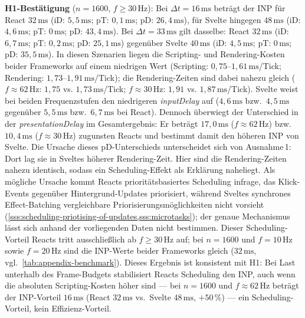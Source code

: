 \noindent\textbf{H1-Bestätigung} ($n = 1600$, $f \geq 30\,\text{Hz}$): Bei $\Delta t = 16\,\text{ms}$ beträgt der INP für React $32\,\text{ms}$ (iD: $5{,}5\,\text{ms}$; pT: $0{,}1\,\text{ms}$; pD: $26{,}4\,\text{ms}$), für Svelte hingegen $48\,\text{ms}$ (iD: $4{,}6\,\text{ms}$; pT: $0\,\text{ms}$; pD: $43{,}4\,\text{ms}$). Bei $\Delta t = 33\,\text{ms}$ gilt dasselbe: React $32\,\text{ms}$ (iD: $6{,}7\,\text{ms}$; pT: $0{,}2\,\text{ms}$; pD: $25{,}1\,\text{ms}$) gegenüber Svelte $40\,\text{ms}$ (iD: $4{,}5\,\text{ms}$; pT: $0\,\text{ms}$; pD: $35{,}5\,\text{ms}$). In diesen Szenarien liegen die Scripting- und Rendering-Kosten beider Frameworks auf einem niedrigen Wert (Scripting: $0{,}75$--$1{,}61\,\text{ms}$/Tick; Rendering: $1{,}73$--$1{,}91\,\text{ms}$/Tick); die Rendering-Zeiten sind dabei nahezu gleich ($f \approx 62\,\text{Hz}$: $1{,}75$ vs. $1{,}73\,\text{ms}$/Tick; $f \approx 30\,\text{Hz}$: $1{,}91$ vs. $1{,}87\,\text{ms}$/Tick). Svelte weist bei beiden Frequenzstufen den niedrigeren \textit{inputDelay} auf ($4{,}6\,\text{ms}$ bzw.\ $4{,}5\,\text{ms}$ gegenüber $5{,}5\,\text{ms}$ bzw.\ $6{,}7\,\text{ms}$ bei React). Dennoch überwiegt der Unterschied in der \textit{presentationDelay} im Gesamtergebnis: Er beträgt $17{,}0\,\text{ms}$ ($f \approx 62\,\text{Hz}$) bzw.\ $10{,}4\,\text{ms}$ ($f \approx 30\,\text{Hz}$) zugunsten Reacts und bestimmt damit den höheren INP von Svelte. Die Ursache dieses pD-Unterschieds unterscheidet sich von Ausnahme\,1: Dort lag sie in Sveltes höherer Rendering-Zeit. Hier sind die Rendering-Zeiten nahezu identisch, sodass ein Scheduling-Effekt als Erklärung naheliegt. Als mögliche Ursache kommt Reacts prioritätsbasiertes Scheduling infrage, das Klick-Events gegenüber Hintergrund-Updates priorisiert, während Sveltes synchrones Effect-Batching vergleichbare Priorisierungsmöglichkeiten nicht vorsieht (\cref{sss:scheduling-priotising-of-updates,sss:microtasks}); der genaue Mechanismus lässt sich anhand der vorliegenden Daten nicht bestimmen. Dieser Scheduling-Vorteil Reacts tritt ausschließlich ab $f \geq 30\,\text{Hz}$ auf; bei $n = 1600$ und $f = 10\,\text{Hz}$ sowie $f = 20\,\text{Hz}$ sind die INP-Werte beider Frameworks gleich ($32\,\text{ms}$, vgl.~\cref{tab:appendix-benchmark}). Dieses Ergebnis ist konsistent mit H1: Bei Last unterhalb des Frame-Budgets stabilisiert Reacts Scheduling den INP, auch wenn die absoluten Scripting-Kosten höher sind — bei $n = 1600$ und $f \approx 62\,\text{Hz}$ beträgt der INP-Vorteil $16\,\text{ms}$ (React $32\,\text{ms}$ vs.\ Svelte $48\,\text{ms}$, $+50\,\%$) — ein Scheduling-Vorteil, kein Effizienz-Vorteil.


